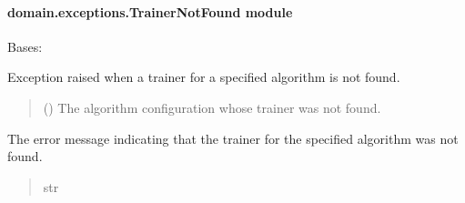 \documentclass[letterpaper,10pt,english]{sphinxmanual}
\begin{document}
\paragraph{domain.exceptions.TrainerNotFound module}
\label{\detokenize{domain.exceptions:module-domain.exceptions.TrainerNotFound}}\label{\detokenize{domain.exceptions:domain-exceptions-trainernotfound-module}}

\begin{fulllineitems}
\label{\detokenize{domain.exceptions:domain.exceptions.TrainerNotFound.TrainerNotFound}}
\pysigstartsignatures
{}
\pysigstopsignatures
\sphinxAtStartPar
Bases: 

\sphinxAtStartPar
Exception raised when a trainer for a specified algorithm is not found.
\begin{quote}\begin{description}
\sphinxAtStartPar
{} ({\hyperref[\detokenize{domain.interfaces:domain.interfaces.AlgorithmConfigurator.AlgorithmConfigurator}]{}}) \textendash{} The algorithm configuration whose trainer was not found.

\end{description}\end{quote}

\begin{fulllineitems}
\label{\detokenize{domain.exceptions:domain.exceptions.TrainerNotFound.TrainerNotFound.message}}
\pysigstartsignatures
{}
\pysigstopsignatures
\sphinxAtStartPar
The error message indicating that the trainer for the specified algorithm was not found.
\begin{quote}\begin{description}
\sphinxAtStartPar
str

\end{description}\end{quote}

\end{fulllineitems}


\end{fulllineitems}
\end{document}

